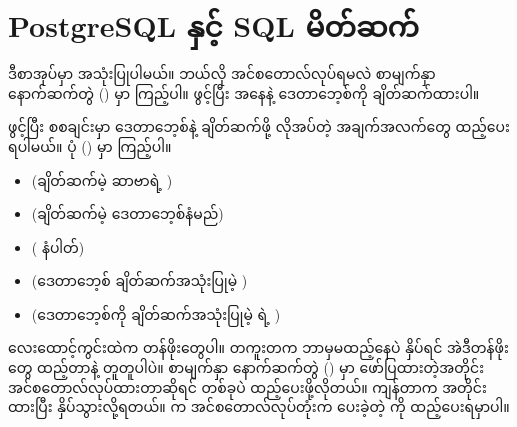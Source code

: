 \section{PostgreSQL နှင့် SQL မိတ်ဆက်}
ဒီစာအုပ်မှာ  အသုံးပြုပါမယ်။  ဘယ်လို အင်စတောလ်လုပ်ရမလဲ စာမျက်နှာ \fRefNo{\pageref{apdx3}} နောက်ဆက်တွဲ (\fRefNo{\ref{apdx3}}) မှာ ကြည့်ပါ။  ဖွင့်ပြီး  အနေနဲ့  ဒေတာဘေ့စ်ကို ချိတ်ဆက်ထားပါ။

\begin{figure}[tbh!]
\caption{} 
\label{fig:psqlconnect}
\end{figure}

 ဖွင့်ပြီး စစချင်းမှာ ဒေတာဘေ့စ်နဲ့ ချိတ်ဆက်ဖို့ လိုအပ်တဲ့ အချက်အလက်တွေ ထည့်ပေးရပါမယ်။ ပုံ (\fRefNo{\ref{fig:psqlconnect}}) မှာ ကြည့်ပါ။ 
%
\begin{itemize}
\item {} (ချိတ်ဆက်မဲ့ ဆာဗာရဲ့ )
\item {} (ချိတ်ဆက်မဲ့ ဒေတာဘေ့စ်နံမည်)
\item {} ( နံပါတ်)
\item {} (ဒေတာဘေ့စ် ချိတ်ဆက်အသုံးပြုမဲ့ )
\item {} (ဒေတာဘေ့စ်ကို ချိတ်ဆက်အသုံးပြုမဲ့  ရဲ့ )
\end{itemize}
%

လေးထောင့်ကွင်းထဲက  တန်ဖိုးတွေပါ။ တကူးတက ဘာမှမထည့်နေပဲ  နှိပ်ရင် အဲဒီတန်ဖိုးတွေ ထည့်တာနဲ့ တူတူပါပဲ။ စာမျက်နှာ \fRefNo{\pageref{apdx3}} နောက်ဆက်တွဲ (\fRefNo{\ref{apdx3}}) မှာ ဖော်ပြထားတဲ့အတိုင်း အင်စတောလ်လုပ်ထားတာဆိုရင်  တစ်ခုပဲ ထည့်ပေးဖို့လိုတယ်။ ကျန်တာက  အတိုင်းထားပြီး  နှိပ်သွားလို့ရတယ်။  က အင်စတောလ်လုပ်တုံးက ပေးခဲ့တဲ့  ကို ထည့်ပေးရမှာပါ။

